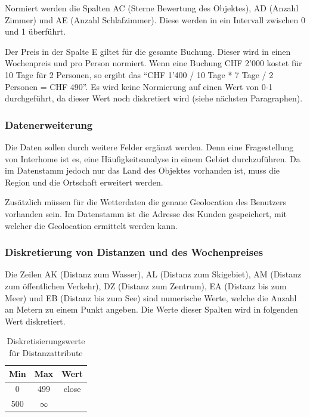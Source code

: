 Normiert werden die Spalten AC (Sterne Bewertung des Objektes), AD (Anzahl Zimmer) und AE (Anzahl Schlafzimmer). Diese werden in ein Intervall zwischen 0 und 1 überführt.

Der Preis in der Spalte E giltet für die gesamte Buchung. Dieser wird in einen Wochenpreis und pro Person normiert. Wenn eine Buchung CHF 2'000 kostet für 10 Tage für 2 Personen, so ergibt das "`CHF 1'400 / 10 Tage * 7 Tage / 2 Personen = CHF 490"'. Es wird keine Normierung auf einen Wert von 0-1 durchgeführt, da dieser Wert noch diskretiert wird (siehe nächsten Paragraphen).

\subsubsection{Datenerweiterung} 
Die Daten sollen durch weitere Felder ergänzt werden. Denn eine Fragestellung von Interhome ist es, eine Häufigkeitsanalyse in einem Gebiet durchzuführen. Da im Datenstamm jedoch nur das Land des Objektes vorhanden ist, muss die Region und die Ortschaft erweitert werden. 

Zusätzlich müssen für die Wetterdaten die genaue Geolocation des Benutzers vorhanden sein. Im Datenstamm ist die Adresse des Kunden gespeichert, mit welcher die Geolocation ermittelt werden kann.

\subsubsection{Diskretierung von Distanzen und des Wochenpreises} 
\label{sec:recherche:datenvorbereitung:diskretierung}
Die Zeilen AK (Distanz zum Wasser), AL (Distanz zum Skigebiet), AM (Distanz zum öffentlichen Verkehr), DZ (Distanz zum Zentrum), EA (Distanz bis zum Meer) und EB (Distanz bis zum See) sind numerische Werte, welche die Anzahl an Metern zu einem Punkt angeben. Die Werte dieser Spalten wird in folgenden Wert diskretiert. 

\begin{table}[h] 
	\caption{Diskretisierungswerte für Distanzattribute}
	\centering
	\label{fig:recherche:datenvorbereitung:1}
	\begin{tabular}{ | c | c | c | } 
		\hline 
		\rowcolor{tableheadcolor}
		\bfseries Min & \bfseries Max & \bfseries Wert \\ \hline 
		0 & 499 & close \\ \hline 
		500 & $\infty$ &   \\ \hline 
	\end{tabular}
\end{table}

